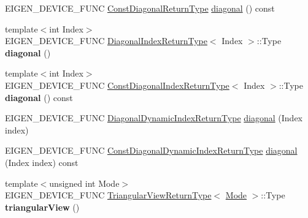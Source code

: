 \begin{DoxyCompactItemize}
\item 
E\+I\+G\+E\+N\+\_\+\+D\+E\+V\+I\+C\+E\+\_\+\+F\+U\+NC \mbox{\hyperlink{class_eigen_1_1_transpose}{Const\+Diagonal\+Return\+Type}} \mbox{\hyperlink{class_eigen_1_1_matrix_base_aebdeedcf67e46d969c556c6c7d9780ee}{diagonal}} () const
\item 
\mbox{\label{class_eigen_1_1_matrix_base_a1a8412c8c27fe8252c5b78dccaa7b138}} 
{\footnotesize template$<$int Index$>$ }\\E\+I\+G\+E\+N\+\_\+\+D\+E\+V\+I\+C\+E\+\_\+\+F\+U\+NC \mbox{\hyperlink{struct_eigen_1_1_matrix_base_1_1_diagonal_index_return_type}{Diagonal\+Index\+Return\+Type}}$<$ Index $>$\+::Type {\bfseries diagonal} ()
\item 
\mbox{\label{class_eigen_1_1_matrix_base_a51d1e669b63020884c2039a64746012c}} 
{\footnotesize template$<$int Index$>$ }\\E\+I\+G\+E\+N\+\_\+\+D\+E\+V\+I\+C\+E\+\_\+\+F\+U\+NC \mbox{\hyperlink{struct_eigen_1_1_matrix_base_1_1_const_diagonal_index_return_type}{Const\+Diagonal\+Index\+Return\+Type}}$<$ Index $>$\+::Type {\bfseries diagonal} () const
\item 
E\+I\+G\+E\+N\+\_\+\+D\+E\+V\+I\+C\+E\+\_\+\+F\+U\+NC \mbox{\hyperlink{class_eigen_1_1_diagonal}{Diagonal\+Dynamic\+Index\+Return\+Type}} \mbox{\hyperlink{class_eigen_1_1_matrix_base_a8a13d4b8efbd7797ee8efd3dd988a7f7}{diagonal}} (Index index)
\item 
E\+I\+G\+E\+N\+\_\+\+D\+E\+V\+I\+C\+E\+\_\+\+F\+U\+NC \mbox{\hyperlink{class_eigen_1_1_transpose}{Const\+Diagonal\+Dynamic\+Index\+Return\+Type}} \mbox{\hyperlink{class_eigen_1_1_matrix_base_aed11a711c0a3d5dbf8bc094008e29846}{diagonal}} (Index index) const
\item 
\mbox{\label{class_eigen_1_1_matrix_base_a7093874188884245e4c19bac54a50830}} 
{\footnotesize template$<$unsigned int Mode$>$ }\\E\+I\+G\+E\+N\+\_\+\+D\+E\+V\+I\+C\+E\+\_\+\+F\+U\+NC \mbox{\hyperlink{struct_eigen_1_1_matrix_base_1_1_triangular_view_return_type}{Triangular\+View\+Return\+Type}}$<$ \mbox{\hyperlink{struct_mode}{Mode}} $>$\+::Type {\bfseries triangular\+View} ()
\item 
\mbox{\label{class_eigen_1_1_matrix_base_add8c4619b547011f50a1484c0a4facd6}} 

\end{DoxyCompactItemize}
